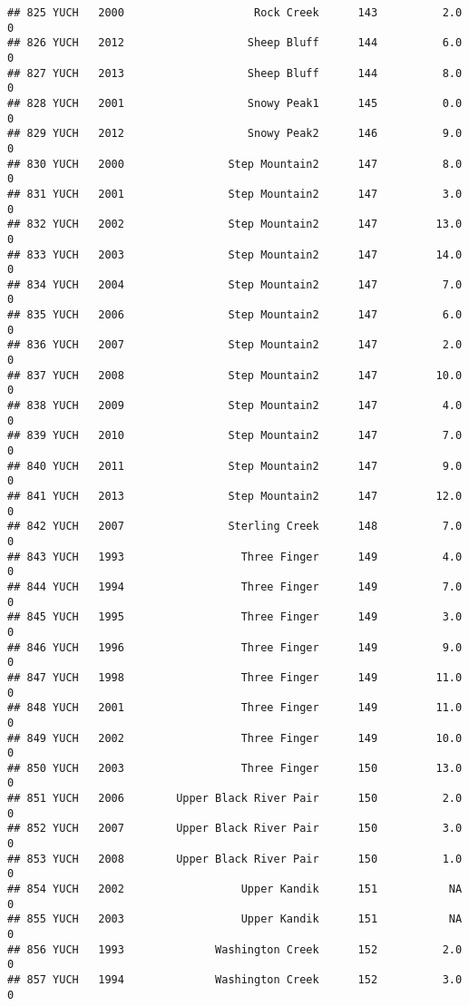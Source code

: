 \documentclass[
]{article}
\begin{document}
\begin{verbatim}
## 825 YUCH   2000                    Rock Creek      143          2.0       0
## 826 YUCH   2012                   Sheep Bluff      144          6.0       0
## 827 YUCH   2013                   Sheep Bluff      144          8.0       0
## 828 YUCH   2001                   Snowy Peak1      145          0.0       0
## 829 YUCH   2012                   Snowy Peak2      146          9.0       0
## 830 YUCH   2000                Step Mountain2      147          8.0       0
## 831 YUCH   2001                Step Mountain2      147          3.0       0
## 832 YUCH   2002                Step Mountain2      147         13.0       0
## 833 YUCH   2003                Step Mountain2      147         14.0       0
## 834 YUCH   2004                Step Mountain2      147          7.0       0
## 835 YUCH   2006                Step Mountain2      147          6.0       0
## 836 YUCH   2007                Step Mountain2      147          2.0       0
## 837 YUCH   2008                Step Mountain2      147         10.0       0
## 838 YUCH   2009                Step Mountain2      147          4.0       0
## 839 YUCH   2010                Step Mountain2      147          7.0       0
## 840 YUCH   2011                Step Mountain2      147          9.0       0
## 841 YUCH   2013                Step Mountain2      147         12.0       0
## 842 YUCH   2007                Sterling Creek      148          7.0       0
## 843 YUCH   1993                  Three Finger      149          4.0       0
## 844 YUCH   1994                  Three Finger      149          7.0       0
## 845 YUCH   1995                  Three Finger      149          3.0       0
## 846 YUCH   1996                  Three Finger      149          9.0       0
## 847 YUCH   1998                  Three Finger      149         11.0       0
## 848 YUCH   2001                  Three Finger      149         11.0       0
## 849 YUCH   2002                  Three Finger      149         10.0       0
## 850 YUCH   2003                  Three Finger      150         13.0       0
## 851 YUCH   2006        Upper Black River Pair      150          2.0       0
## 852 YUCH   2007        Upper Black River Pair      150          3.0       0
## 853 YUCH   2008        Upper Black River Pair      150          1.0       0
## 854 YUCH   2002                  Upper Kandik      151           NA       0
## 855 YUCH   2003                  Upper Kandik      151           NA       0
## 856 YUCH   1993              Washington Creek      152          2.0       0
## 857 YUCH   1994              Washington Creek      152          3.0       0

\end{verbatim}
\end{document}

